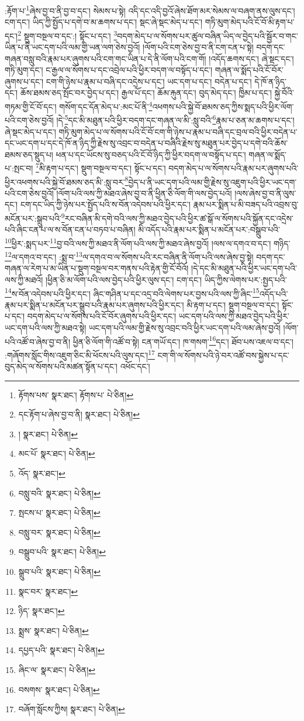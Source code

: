 :རྟོག་པ་\footnote{རྟོགས་པས་  སྣར་ཐང་། རྟོགས་པ་  པེ་ཅིན། }ཞེས་བྱ་བ་ནི་བྱ་བ་དང་། སེམས་པ་སྟེ། འདི་དང་འདི་བྱའོ་ཞེས་ཐོག་མར་སེམས་ལ་བཞག་ནས་ལུས་དང་། ངག་དང་། ཡིད་ཀྱི་སྤྱོད་པ་དགེ་བ་མ་ཆགས་པ་དང་། སྡང་ཞེ་སྡང་མེད་པ་དང་། གཏི་མུག་མེད་པའི་ངོ་བོ་མི་རྟག་པ་དང་།\footnote{དང་རྟོག་པ་ཞེས་བྱ་བ་ནི།  སྣར་ཐང་།  པེ་ཅིན། } སྡུག་བསྔལ་བ་དང་:། སྟོང་པ་དང་། \footnote{།    སྣར་ཐང་།  པེ་ཅིན། }བདག་མེད་པ་ལ་སོགས་པར་ཚུལ་བཞིན་ཡིད་ལ་བྱེད་པའི་སྦྱོར་བ་གང་ཡིན་པ་ནི་ཡང་དག་པའི་ལམ་གྱི་ཡན་ལག་ཅེས་བྱའོ། །ལོག་པའི་ངག་ཅེས་བྱ་བ་ནི་ངག་ངན་པ་སྟེ། བདག་དང་གཞན་བསླུ་བའི་རྣམ་པར་ཞུགས་པའི་ངག་གང་ཡིན་པ་དེ་ནི་ལོག་པའི་ངག་གོ། །འདོད་ཆགས་དང་། ཞེ་སྡང་དང་། གཏི་མུག་དང་། ང་རྒྱལ་ལ་སོགས་པ་དང་འབྲེལ་པའི་ཕྱིར་བདག་ལ་བསྟོད་པ་དང་། གཞན་ལ་སྨོད་པའི་ངོ་བོར་ཞུགས་པ་དང་། ངག་གི་ཉེས་པ་རྣམ་པ་བཞི་དང་འདྲེས་པ་དང་། ཡང་དག་པ་དང་། བདེན་པ་དང་། དེ་ཁོ་ན་ཉིད་དང་། ཆོས་ཐམས་ཅད་སྤོང་བར་བྱེད་པ་དང་། རྒྱལ་པོ་དང་། ཆོམ་རྐུན་དང་། བུད་མེད་དང་། ཁྱིམ་པ་དང་། སྐྱེ་བོའི་གཏམ་གྱི་ངོ་བོ་དང་། གསོག་དང་དོན་མེད་པ་:མང་པོ་ནི་\footnote{མང་པོ་  སྣར་ཐང་།  པེ་ཅིན། }འཕགས་པའི་སྐྱེ་བོ་ཐམས་ཅད་ཀྱིས་སྨད་པའི་ཕྱིར་ལོག་པའི་ངག་ཅེས་བྱའོ། །དེ་\footnote{འོད་  སྣར་ཐང་། }དང་མི་མཐུན་པའི་ཕྱིར་བདག་དང་གཞན་ལ་མི་:སླུ་བའི་\footnote{བསླུ་བའི་  སྣར་ཐང་།  པེ་ཅིན། }རྣམ་པ་ཅན་མ་ཆགས་པ་དང་། ཞེ་སྡང་མེད་པ་དང་། གཏི་མུག་མེད་པ་ལ་སོགས་པའི་ངོ་བོ་ངག་གི་ཉེས་པ་རྣམ་པ་བཞི་དང་བྲལ་བའི་ཕྱིར་བདེན་པ་དང་ཡང་དག་པ་དང་དེ་ཁོ་ན་ཉིད་ཀྱི་རྗེས་སུ་འབྲང་བ་བདེན་པ་བཞིའི་རྗེས་སུ་མཐུན་པར་བྱེད་པ་དགེ་བའི་ཆོས་ཐམས་ཅད་སྡུད་པ། ཕན་པ་དང་ཡོངས་སུ་བཅད་པའི་ངོ་བོ་ཉིད་ཀྱི་ཕྱིར་བདག་ལ་བསྟོད་པ་དང་། གཞན་ལ་སྨོད་པ་:སྤང་བ། \footnote{སྤངས་པ་  སྣར་ཐང་།  པེ་ཅིན། }མི་རྟག་པ་དང་། སྡུག་བསྔལ་བ་དང་། སྟོང་པ་དང་། བདག་མེད་པ་ལ་སོགས་པའི་རྣམ་པར་ཞུགས་པའི་ཕྱིར་འཕགས་པའི་སྐྱེ་བོ་ཐམས་ཅད་མི་:སླུ་བར་\footnote{བསླུ་བར་  སྣར་ཐང་།  པེ་ཅིན། }བྱེད་པ་ནི་ཡང་དག་པའི་ལམ་གྱི་རྗེས་སུ་འཇུག་པའི་ཕྱིར་ཡང་དག་པའི་ངག་ཅེས་བྱའོ། །ལོག་པའི་ལས་ཀྱི་མཐའ་ཞེས་བྱ་བ་ནི་ཕྱིན་ཅི་ལོག་གི་ལས་བྱེད་པའོ། །ལས་ཞེས་བྱ་བ་ནི་ལུས་དང་། ངག་དང་ཡིད་ཀྱི་ཉེས་པར་སྤྱོད་པའི་ས་བོན་འདེབས་པའི་ཕྱིར་དང་། རྣམ་པར་སྨིན་པ་མི་བཟད་པའི་འབྲས་བུ་མངོན་པར་:སྒྲུབ་པའི་\footnote{བསྒྲུབ་པའི་  སྣར་ཐང་།  པེ་ཅིན། }རང་བཞིན་མི་དགེ་བའི་ལས་ཀྱི་མཐའ་བྱེད་པའི་ཕྱིར་ཚ་སྒོ་ལ་སོགས་པའི་སྐྱོན་དང་འདྲེས་པའི་ཞིང་ངན་པ་ལ་ས་བོན་ངན་པ་བཏབ་པ་བཞིན། མི་འདོད་པའི་རྣམ་པར་སྨིན་པ་མངོན་པར་:བསྒྲུབ་པའི་\footnote{སྒྲུབ་པའི་  སྣར་ཐང་།  པེ་ཅིན། }ཕྱིར་:སྨད་པར་\footnote{སྣང་བར་  སྣར་ཐང་། }བྱ་བའི་ལས་ཀྱི་མཐའ་ནི་ལོག་པའི་ལས་ཀྱི་མཐའ་ཞེས་བྱའོ། །ལས་ལ་དགའ་བ་དང་། གཉིད་\footnote{ཉིད་  སྣར་ཐང་། }ལ་དགའ་བ་དང་། :སྨྲ་བ་\footnote{སྨྲས་  སྣར་ཐང་།  པེ་ཅིན། }ལ་དགའ་བ་ལ་སོགས་པའི་རང་བཞིན་ནི་ལོག་པའི་ལས་ཞེས་བྱ་སྟེ། བདག་དང་གཞན་ལ་རེག་པ་མ་ཡིན་པ་སྡུག་བསྔལ་བར་གནས་པའི་རྟེན་གྱི་ངོ་བོའོ། །དེ་དང་མི་མཐུན་པའི་ཕྱིར་ཡང་དག་པའི་ལས་ཀྱི་མཐའོ། །ཕྱིན་ཅི་མ་ལོག་པའི་ལས་བྱེད་པའི་ཕྱིར་ལུས་དང་། ངག་དང་། ཡིད་ཀྱིས་ལེགས་པར་:སྤྱད་པའི་\footnote{དཔྱད་པའི་  སྣར་ཐང་།  པེ་ཅིན། }ས་བོན་འདེབས་པའི་ཕྱིར་དང་། ཞིང་གཤིན་པ་དང་འདྲ་བའི་ལེགས་པར་བྱས་པའི་ལས་ཀྱི་ཞིང་\footnote{ཞིང་ལ་  སྣར་ཐང་།  པེ་ཅིན། }འདོད་པའི་རྣམ་པར་སྨིན་པ་མངོན་པར་སྒྲུབ་པའི་རྣམ་པར་ཞུགས་པའི་ཕྱིར་དང་། མི་རྟག་པ་དང་། སྡུག་བསྔལ་བ་དང་། སྟོང་པ་དང་། བདག་མེད་པ་ལ་སོགས་པའི་ངོ་བོར་ཞུགས་པའི་ཕྱིར་དང་། ཡང་དག་པའི་ལས་ཀྱི་མཐའ་བྱེད་པའི་ཕྱིར་ཡང་དག་པའི་ལས་ཀྱི་མཐའ་སྟེ། ཡང་དག་པའི་ལམ་གྱི་རྗེས་སུ་འབྲང་བའི་ཕྱིར་ཡང་དག་པའི་ལམ་ཞེས་བྱའོ། །ལོག་པའི་འཚོ་བ་ཞེས་བྱ་བ་ནི། ཕྱིན་ཅི་ལོག་གི་འཚོ་བ་སྟེ། ངན་གཡོ་དང་། ཁ་གསག་\footnote{བསགས་  སྣར་ཐང་།  པེ་ཅིན། }དང་། ཐོབ་པས་འཇལ་བ་དང་། :གཞོགས་སློང་གིས་འཇུག་ཅིང་མི་ཕོངས་པའི་ལུས་དང་།\footnote{བཞོག་སློངས་ཀྱིས།  སྣར་ཐང་།  པེ་ཅིན། } ངག་གི་ལ་སོགས་པའི་ཉེ་བར་འཚོ་བས་སྐྱེས་པ་དང་བུད་མེད་ལ་སོགས་པའི་མཚན་སྟོན་པ་དང་། འཕོང་དང་། 